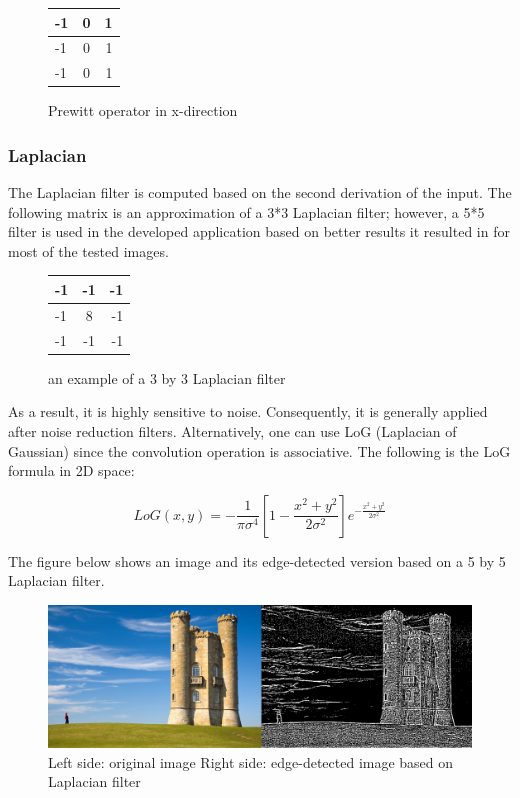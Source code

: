 \documentclass{article}
\begin{document}
\begin{figure}[H]
\begin{center}
 \begin{tabular}{ | l | c | r | }
    \hline
    -1 & 0 & 1 \\ \hline
    -1 & 0 & 1 \\ \hline
    -1 & 0 & 1 \\
    \hline
  \end{tabular}
\end{center}
\caption{Prewitt operator in x-direction}\end{figure}

		
		\subsubsection{Laplacian}
			The Laplacian filter is computed based on the second derivation of the input. The following matrix is an approximation of a 3*3 Laplacian filter; however, a 5*5 filter is used in the developed application based on better results it resulted in for
most of the tested images.

\begin{figure}[H]
	\begin{center}
  \begin{tabular}{ | l | c | r | }
    \hline
    -1 & -1 & -1 \\ \hline
    -1 & 8 & -1 \\ \hline
    -1 & -1 & -1 \\
    \hline
  \end{tabular}
\end{center}
\caption{an example of a 3 by 3 Laplacian filter}\end{figure}


			 As a result, it is highly sensitive to noise. Consequently,
			it is generally applied after noise reduction filters. Alternatively, one can use LoG (Laplacian of Gaussian) since the convolution operation is
			associative. The following is the LoG formula in 2D space:

			\[LoG(x,y) = -\frac{1}{\pi\sigma^{4}}[1-\frac{x^{2}+y^{2}}{2\sigma^{2}}]e^{-\frac{x^{2}+y^{2}}{2\sigma^{2}}}\]

			The figure below shows an image and its edge-detected version based on a 5 by 5 Laplacian filter.
	\begin{figure} [H]
		\centering
		\includegraphics[scale=.3]{images/edged}
		\caption{Left side: original image Right side: edge-detected image based on Laplacian filter \label{crop_1}}
	\end{figure}
\end{document}
